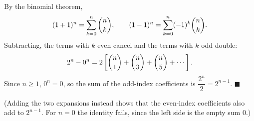 By the binomial theorem,
\[
(1+1)^n=\sum_{k=0}^{n}\dbinom{n}{k},\qquad (1-1)^n=\sum_{k=0}^{n}(-1)^k\dbinom{n}{k}.
\]
Subtracting, the terms with $k$ even cancel and the terms with $k$ odd double:
\[
2^n-0^n=2\left[\dbinom{n}{1}+\dbinom{n}{3}+\dbinom{n}{5}+\cdots\right].
\]
Since $n\ge1$, $0^n=0$, so the sum of the odd-index coefficients is $\dfrac{2^n}{2}=2^{n-1}$. $\blacksquare$

(Adding the two expansions instead shows that the even-index coefficients also add to $2^{n-1}$. For $n=0$ the identity fails, since the left side is the empty sum $0$.)
